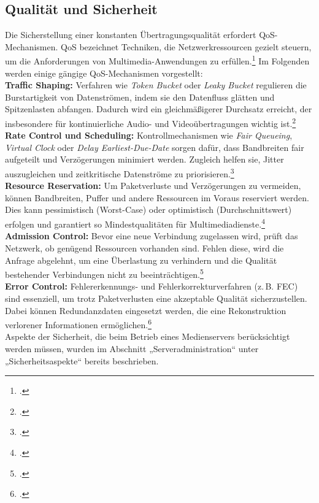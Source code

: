 \documentclass[12pt,a4paper]{report}
\begin{document}
  \subsection{Qualität und Sicherheit}  
  Die Sicherstellung einer konstanten Übertragungsqualität erfordert \ac{QoS}-Mechanismen.  
  \ac{QoS} bezeichnet Techniken, die Netzwerkressourcen gezielt steuern, um die Anforderungen von Multimedia-Anwendungen zu erfüllen.\footcite[Vgl.][S.~9~ff.]{steinmetz_multimedia}  
  Im Folgenden werden einige gängige \ac{QoS}-Mechanismen vorgestellt: 
  \\
  \newline
  \textbf{Traffic Shaping:}  
  Verfahren wie \emph{Token Bucket} oder \emph{Leaky Bucket} regulieren die Burstartigkeit von Datenströmen, indem sie den Datenfluss glätten und Spitzenlasten abfangen.  
  Dadurch wird ein gleichmäßigerer Durchsatz erreicht, der insbesondere für kontinuierliche Audio- und Videoübertragungen wichtig ist.\footcite[Vgl.][S.~61~f.]{steinmetz_multimedia}  
  \\
  \newline
  \textbf{Rate Control und Scheduling:}  
  Kontrollmechanismen wie \emph{Fair Queueing}, \emph{Virtual Clock} oder \emph{Delay Earliest-Due-Date} sorgen dafür, 
  dass Bandbreiten fair aufgeteilt und Verzögerungen minimiert werden.  
  Zugleich helfen sie, Jitter auszugleichen und zeitkritische Datenströme zu priorisieren.\footcite[Vgl.][S.~62~f.]{steinmetz_multimedia}  
  \\
  \newline
  \textbf{Resource Reservation:}  
  Um Paketverluste und Verzögerungen zu vermeiden, können Bandbreiten, Puffer und andere Ressourcen im Voraus reserviert werden.  
  Dies kann pessimistisch (Worst-Case) oder optimistisch (Durchschnittswert) erfolgen und garantiert so Mindestqualitäten für Multimediadienste.\footcite[Vgl.][S.~52~f.]{steinmetz_multimedia}  
  \\
  \newline
  \textbf{Admission Control:}  
  Bevor eine neue Verbindung zugelassen wird, prüft das Netzwerk, ob genügend Ressourcen vorhanden sind.  
  Fehlen diese, wird die Anfrage abgelehnt, um eine Überlastung zu verhindern und die Qualität bestehender Verbindungen nicht zu beeinträchtigen.\footcite[Vgl.][S.~50~f.]{steinmetz_multimedia}  
  \\
  \newline
  \textbf{Error Control:}  
  Fehlererkennungs- und Fehlerkorrekturverfahren (z.\,B. \acs{FEC}) sind essenziell, 
  um trotz Paketverlusten eine akzeptable Qualität sicherzustellen.  
  Dabei können Redundanzdaten eingesetzt werden, die eine Rekonstruktion verlorener Informationen ermöglichen.\footcite[Vgl.][S.~68]{steinmetz_multimedia}  
  \\
  \newline  
  Aspekte der Sicherheit, die beim Betrieb eines Medienservers berücksichtigt werden müssen,
  wurden im Abschnitt „Serveradministration“ unter „Sicherheitsaspekte“ bereits beschrieben. 
    
\end{document}
